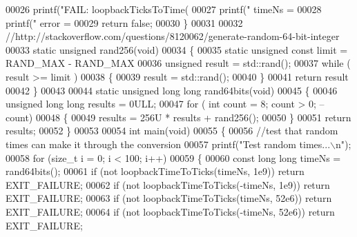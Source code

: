 \begin{DoxyCode}
{{{00026     printf(\textcolor{stringliteral}{"FAIL: loopbackTicksToTime(%
00027     printf(\textcolor{stringliteral}{"    timeNs = %
00028     printf(\textcolor{stringliteral}{"    error = %
00029     \textcolor{keywordflow}{return} \textcolor{keyword}{false};
00030 \}
00031 
00032 \textcolor{comment}{//http://stackoverflow.com/questions/8120062/generate-random-64-bit-integer}
00033 \textcolor{keyword}{static} \textcolor{keywordtype}{unsigned} rand256(\textcolor{keywordtype}{void})
00034 \{
00035     \textcolor{keyword}{static} \textcolor{keywordtype}{unsigned} \textcolor{keyword}{const} limit = RAND\_MAX - RAND\_MAX %
00036     \textcolor{keywordtype}{unsigned} result = std::rand();
00037     \textcolor{keywordflow}{while} ( result >= limit )
00038     \{
00039         result = std::rand();
00040     \}
00041     \textcolor{keywordflow}{return} result %
00042 \}
00043 
00044 \textcolor{keyword}{static} \textcolor{keywordtype}{unsigned} \textcolor{keywordtype}{long} \textcolor{keywordtype}{long} rand64bits(\textcolor{keywordtype}{void})
00045 \{
00046     \textcolor{keywordtype}{unsigned} \textcolor{keywordtype}{long} \textcolor{keywordtype}{long} results = 0ULL;
00047     \textcolor{keywordflow}{for} ( \textcolor{keywordtype}{int} count = 8; count > 0; -- count)
00048     \{
00049         results = 256U * results + rand256();
00050     \}
00051     \textcolor{keywordflow}{return} results;
00052 \}
00053 
00054 \textcolor{keywordtype}{int} main(\textcolor{keywordtype}{void})
00055 \{
00056     \textcolor{comment}{//test that random times can make it through the conversion}
00057     printf(\textcolor{stringliteral}{"Test random times...\(\backslash\)n"});
00058     \textcolor{keywordflow}{for} (\textcolor{keywordtype}{size\_t} i = 0; i < 100; i++)
00059     \{
00060         \textcolor{keyword}{const} \textcolor{keywordtype}{long} \textcolor{keywordtype}{long} timeNs = rand64bits();
00061         \textcolor{keywordflow}{if} (not loopbackTimeToTicks(timeNs, 1e9)) \textcolor{keywordflow}{return} EXIT\_FAILURE;
00062         \textcolor{keywordflow}{if} (not loopbackTimeToTicks(-timeNs, 1e9)) \textcolor{keywordflow}{return} EXIT\_FAILURE;
00063         \textcolor{keywordflow}{if} (not loopbackTimeToTicks(timeNs, 52e6)) \textcolor{keywordflow}{return} EXIT\_FAILURE;
00064         \textcolor{keywordflow}{if} (not loopbackTimeToTicks(-timeNs, 52e6)) \textcolor{keywordflow}{return} EXIT\_FAILURE;
}}}}}}
\end{DoxyCode}

